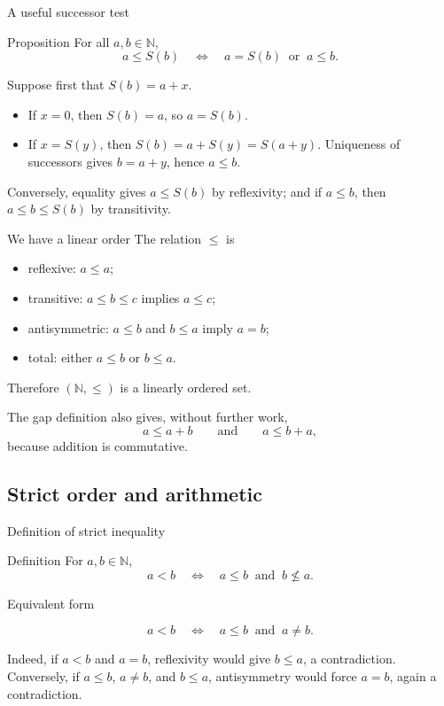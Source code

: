 \documentclass[aspectratio=169,11pt]{beamer}
\newcommand{\N}{\mathbb N}
\newcommand{\suc}[1]{S(#1)}
\begin{document}
\begin{frame}{A useful successor test}
  \begin{block}{Proposition}
    For all \(a,b\in\N\),
    \[
      a\le\suc b
      \quad\Longleftrightarrow\quad
      a=\suc b\ \text{ or }\ a\le b.
    \]
  \end{block}

  Suppose first that \(\suc b=a+x\).
  \begin{itemize}
    \item If \(x=0\), then \(\suc b=a\), so \(a=\suc b\).
    \item If \(x=\suc y\), then
      \(\suc b=a+\suc y=\suc{a+y}\).  Uniqueness of successors gives
      \(b=a+y\), hence \(a\le b\).
  \end{itemize}

  Conversely, equality gives \(a\le\suc b\) by reflexivity; and if \(a\le b\),
  then \(a\le b\le\suc b\) by transitivity.
\end{frame}

\begin{frame}{We have a linear order}
  The relation \(\leq\) is
  \begin{itemize}
    \item \alert{reflexive}: \(a\le a\);
    \item \alert{transitive}: \(a\le b\le c\) implies \(a\le c\);
    \item \alert{antisymmetric}: \(a\le b\) and \(b\le a\) imply \(a=b\);
    \item \alert{total}: either \(a\le b\) or \(b\le a\).
  \end{itemize}

  Therefore \((\N,\le)\) is a \alert{linearly ordered set}.

  The gap definition also gives, without further work,
  \[
    a\le a+b
    \qquad\text{and}\qquad
    a\le b+a,
  \]
  because addition is commutative.
\end{frame}

\subsection{Strict order and arithmetic}

\begin{frame}{Definition of strict inequality}
  \begin{block}{Definition}
    For \(a,b\in\N\),
    \[
      a<b
      \quad\Longleftrightarrow\quad
      a\le b\ \text{ and }\ b\nleq a.
    \]
  \end{block}

  \begin{block}{Equivalent form}

    \[
      a<b
      \quad\Longleftrightarrow\quad
      a\le b\ \text{ and }\ a\ne b.
    \]
  \end{block}

  Indeed, if \(a<b\) and \(a=b\), reflexivity would give \(b\le a\), a
  contradiction.  Conversely, if \(a\le b\), \(a\ne b\), and \(b\le a\),
  antisymmetry would force \(a=b\), again a contradiction.
\end{frame}
\end{document}
